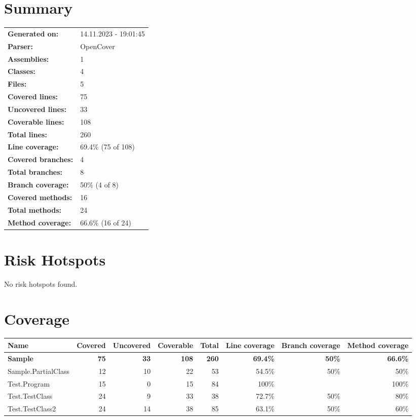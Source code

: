 \documentclass[a4paper,landscape,10pt]{article}
\begin{document}
\setcounter{secnumdepth}{-1}
\section{Summary}
\begin{longtable}[l]{ll}
\textbf{Generated on:} & 14.11.2023 - 19:01:45\\
\textbf{Parser:} & OpenCover\\
\textbf{Assemblies:} & 1\\
\textbf{Classes:} & 4\\
\textbf{Files:} & 5\\
\textbf{Covered lines:} & 75\\
\textbf{Uncovered lines:} & 33\\
\textbf{Coverable lines:} & 108\\
\textbf{Total lines:} & 260\\
\textbf{Line coverage:} & 69.4\% (75 of 108)\\
\textbf{Covered branches:} & 4\\
\textbf{Total branches:} & 8\\
\textbf{Branch coverage:} & 50\% (4 of 8)\\
\textbf{Covered methods:} & 16\\
\textbf{Total methods:} & 24\\
\textbf{Method coverage:} & 66.6\% (16 of 24)\\
\end{longtable}
\section{Risk Hotspots}
No risk hotspots found.
\section{Coverage}
\begin{longtable}[l]{|l|r|r|r|r|r|r|r|}
\hline
\textbf{Name} & \textbf{Covered} & \textbf{Uncovered} & \textbf{Coverable} & \textbf{Total} & \textbf{Line coverage} & \textbf{Branch coverage} & \textbf{Method coverage}\\
\hline
\textbf{Sample} & \textbf{75} & \textbf{33} & \textbf{108} & \textbf{260} & \textbf{69.4\%} & \textbf{50\%} & \textbf{66.6\%}\\
\hline
Sample.PartialClass & 12 & 10 & 22 & 53 & 54.5\% & 50\% & 50\%\\
\hline
Test.Program & 15 & 0 & 15 & 84 & 100\% &  & 100\%\\
\hline
Test.TestClass & 24 & 9 & 33 & 38 & 72.7\% & 50\% & 80\%\\
\hline
Test.TestClass2 & 24 & 14 & 38 & 85 & 63.1\% & 50\% & 60\%\\
\hline
\end{longtable}
\newpage
\end{document}
